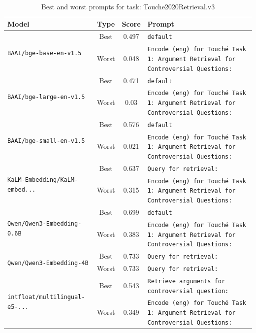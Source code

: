 \begin{table}[t]
\centering
\small
\caption{Best and worst prompts for task: Touche2020Retrieval.v3}
\begin{tabular}{|p{}|c|c|p{}|}
\hline
Model & Type & Score & Prompt \\
\hline
\multirow{2}{=}{\raggedright\texttt{BAAI/\allowbreak bge-\allowbreak base-\allowbreak en-\allowbreak v1.5}} & Best & 0.497 & \texttt{default} \\
\cline{2-4}
& Worst & 0.048 & \texttt{Encode (eng) for Touché Task 1: Argument Retrieval for Controversial Questions:} \\
\hline
\multirow{2}{=}{\raggedright\texttt{BAAI/\allowbreak bge-\allowbreak large-\allowbreak en-\allowbreak v1.5}} & Best & 0.471 & \texttt{default} \\
\cline{2-4}
& Worst & 0.03 & \texttt{Encode (eng) for Touché Task 1: Argument Retrieval for Controversial Questions:} \\
\hline
\multirow{2}{=}{\raggedright\texttt{BAAI/\allowbreak bge-\allowbreak small-\allowbreak en-\allowbreak v1.5}} & Best & 0.576 & \texttt{default} \\
\cline{2-4}
& Worst & 0.021 & \texttt{Encode (eng) for Touché Task 1: Argument Retrieval for Controversial Questions:} \\
\hline
\multirow{2}{=}{\raggedright\texttt{KaLM-\allowbreak Embedding/\allowbreak KaLM-\allowbreak embed...}} & Best & 0.637 & \texttt{Query for retrieval:} \\
\cline{2-4}
& Worst & 0.315 & \texttt{Encode (eng) for Touché Task 1: Argument Retrieval for Controversial Questions:} \\
\hline
\multirow{2}{=}{\raggedright\texttt{Qwen/\allowbreak Qwen3-\allowbreak Embedding-\allowbreak 0.6B}} & Best & 0.699 & \texttt{default} \\
\cline{2-4}
& Worst & 0.383 & \texttt{Encode (eng) for Touché Task 1: Argument Retrieval for Controversial Questions:} \\
\hline
\multirow{2}{=}{\raggedright\texttt{Qwen/\allowbreak Qwen3-\allowbreak Embedding-\allowbreak 4B}} & Best & 0.733 & \texttt{Query for retrieval:} \\
\cline{2-4}
& Worst & 0.733 & \texttt{Query for retrieval:} \\
\hline
\multirow{2}{=}{\raggedright\texttt{intfloat/\allowbreak multilingual-\allowbreak e5-\allowbreak ...}} & Best & 0.543 & \texttt{Retrieve arguments for controversial question:} \\
\cline{2-4}
& Worst & 0.349 & \texttt{Encode (eng) for Touché Task 1: Argument Retrieval for Controversial Questions:} \\
\hline
\end{tabular}
\end{table}

